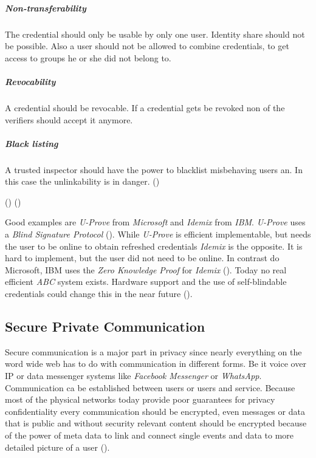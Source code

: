 \subparagraph{Non-transferability}
\label{subp:non_transerability}
The credential should only be usable by only one user. Identity share should not be possible. Also a user should not be allowed to combine credentials, to get access to groups he or she did not belong to.

\subparagraph{Revocability}
\label{subp:revocability}
A credential should be revocable. If a credential gets be revoked non of the verifiers should accept it anymore.

\subparagraph{Black listing}
\label{subp:black_listing}
A trusted inspector should have the power to blacklist misbehaving users an. In this case the unlinkability is in danger. (\cite{tsang2011nymble})

(\cite{chaum1985security})
(\cite{camenisch2001efficient})

Good examples are \textit{U-Prove} from \textit{Microsoft} and \textit{Idemix} from \textit{IBM}. \textit{U-Prove} uses a \textit{Blind Signature Protocol} (\cite{chaum1983blind}). While \textit{U-Prove} is efficient implementable, but needs the user to be online to obtain refreshed credentials \textit{Idemix} is the opposite. It is hard to implement, but the user did not need to be online. In contrast do Microsoft, IBM uses the \textit{Zero Knowledge Proof} for \textit{Idemix} (\cite{camenisch2001efficient}). Today no real efficient \textit{ABC} system exists. Hardware support and the use of self-blindable credentials could change this in the near future (\cite{batina2010developing}). 


\subsection{Secure Private Communication} 
\label{sub:secure_private_communication}
Secure communication is a major part in privacy since nearly everything on the word wide web has to do with communication in different forms. Be it voice over IP or data messenger systems like \textit{Facebook Messenger} or \textit{WhatsApp}. Communication ca be established between users or users and service. Because most of the physical networks today provide poor guarantees for privacy confidentiality every communication should be encrypted, even messages or data that is public and without security relevant content should be encrypted because of the power of meta data to link and connect single events and data to more detailed picture of a user (\cite{fawcett1996combining}).

